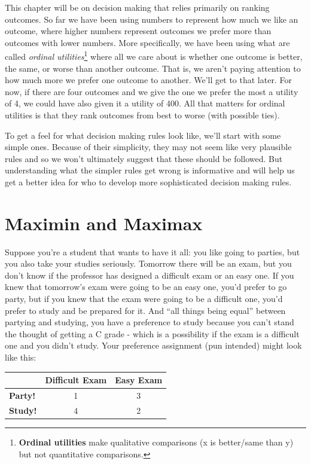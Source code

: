 \documentclass[]{tufte-book}
\begin{document}
This chapter will be on decision making that relies primarily on ranking outcomes. So far we have been using numbers to represent how much we like an outcome, where higher numbers represent outcomes we prefer more than outcomes with lower numbers. More specifically, we have been using what are called \emph{ordinal utilities}\footnote{\textbf{Ordinal utilities} make qualitative comparisons (x is better/same than y) but not quantitative comparisons.} where all we care about is whether one outcome is better, the same, or worse than another outcome. That is, we aren't paying attention to how much more we prefer one outcome to another. We'll get to that later. For now, if there are four outcomes and we give the one we prefer the most a utility of 4, we could have also given it a utility of 400. All that matters for ordinal utilities is that they rank outcomes from best to worse (with possible ties).

To get a feel for what decision making rules look like, we'll start with some simple ones. Because of their simplicity, they may not seem like very plausible rules and so we won't ultimately suggest that these should be followed. But understanding what the simpler rules get wrong is informative and will help us get a better idea for who to develop more sophisticated decision making rules.

\hypertarget{maximin-and-maximax}{%
\section{Maximin and Maximax}\label{maximin-and-maximax}}

Suppose you're a student that wants to have it all: you like going to parties, but you also take your studies seriously. Tomorrow there will be an exam, but you don't know if the professor has designed a difficult exam or an easy one. If you knew that tomorrow's exam were going to be an easy one, you'd prefer to go party, but if you knew that the exam were going to be a difficult one, you'd prefer to study and be prepared for it. And ``all things being equal'' between partying and studying, you have a preference to study because you can't stand the thought of getting a C grade - which is a possibility if the exam is a difficult one and you didn't study. Your preference assignment (pun intended) might look like this:

\begin{longtable}[]{@{}lcc@{}}
\toprule
& Difficult Exam & Easy Exam\tabularnewline
\midrule
\endhead
\textbf{Party!} & 1 & 3\tabularnewline
\textbf{Study!} & 4 & 2\tabularnewline
\bottomrule
\end{longtable}
\end{document}
